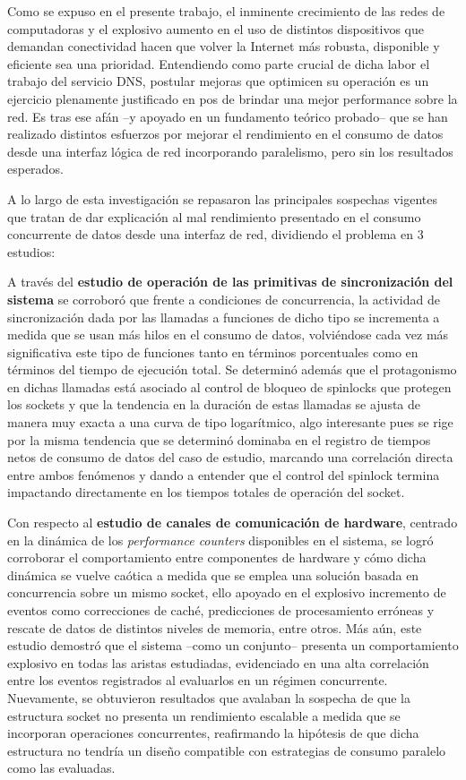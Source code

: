 \begin{conclusion}

Como se expuso en el presente trabajo, el inminente crecimiento de las redes de computadoras y el explosivo aumento en el uso de distintos dispositivos que demandan conectividad hacen que volver la Internet más robusta, disponible y eficiente sea una prioridad. Entendiendo como parte crucial de dicha labor el trabajo del servicio DNS, postular mejoras que optimicen su operación es un ejercicio plenamente justificado en pos de brindar una mejor performance sobre la red. Es tras ese afán --y apoyado en un fundamento teórico probado-- que se han realizado distintos esfuerzos por mejorar el rendimiento en el consumo de datos desde una interfaz lógica de red incorporando paralelismo, pero sin los resultados esperados. 
 
 
A lo largo de esta investigación se repasaron las principales sospechas vigentes que tratan de dar explicación al mal rendimiento presentado en el consumo concurrente de datos desde una interfaz de red, dividiendo el problema en 3 estudios: 
 
 
A través del \textbf{estudio de operación de las primitivas de sincronización del sistema} se corroboró que frente a condiciones de concurrencia, la actividad de sincronización dada por las llamadas a funciones de dicho tipo se incrementa a medida que se usan más hilos en el consumo de datos, volviéndose cada vez más significativa este tipo de funciones tanto en términos porcentuales como en términos del tiempo de ejecución total. Se determinó además que el protagonismo en dichas llamadas está asociado al control de bloqueo de spinlocks que protegen los sockets y que la tendencia en la duración de estas llamadas se ajusta de manera muy exacta a una curva de tipo logarítmico, algo interesante pues se rige por la misma tendencia que se determinó dominaba en el registro de tiempos netos de consumo de datos del caso de estudio, marcando una correlación directa entre ambos fenómenos y dando a entender que el control del spinlock termina impactando directamente en los tiempos totales de operación del socket. 
 
 
Con respecto al \textbf{estudio de canales de comunicación de hardware}, centrado en la dinámica de los \emph{performance counters} disponibles en el sistema, se logró corroborar el comportamiento entre componentes de hardware y cómo dicha dinámica se vuelve caótica a medida que se emplea una solución basada en concurrencia sobre un mismo socket, ello apoyado en el explosivo incremento de eventos como correcciones de caché, predicciones de procesamiento erróneas y rescate de datos de distintos niveles de memoria, entre otros. Más aún, este estudio demostró que el sistema --como un conjunto-- presenta un comportamiento explosivo en todas las aristas estudiadas, evidenciado en una alta correlación entre los eventos registrados al evaluarlos en un régimen concurrente. Nuevamente, se obtuvieron resultados que avalaban la sospecha de que la estructura socket no presenta un rendimiento escalable a medida que se incorporan operaciones concurrentes, reafirmando la hipótesis de que dicha estructura no tendría un diseño compatible con estrategias de consumo paralelo como las evaluadas. 
 

\end{conclusion}
